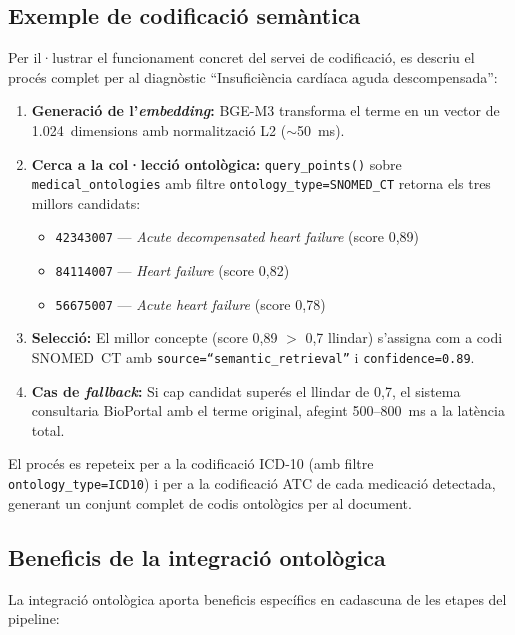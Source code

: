 \documentclass[CAT]{TFUOC}%
\begin{document}
\subsection{Exemple de codificació semàntica}

Per il·lustrar el funcionament concret del servei de codificació, es descriu el procés complet per al diagnòstic ``Insuficiència cardíaca aguda descompensada'':

\begin{enumerate}
    \item \textbf{Generació de l'\textit{embedding}:} BGE-M3 transforma el terme en un vector de 1.024~dimensions amb normalització L2 ($\sim$50~ms).

    \item \textbf{Cerca a la col·lecció ontològica:} \texttt{query\_points()} sobre \texttt{medical\_ontologies} amb filtre \texttt{ontology\_type=SNOMED\_CT} retorna els tres millors candidats:
    \begin{itemize}
        \item \texttt{42343007} --- \textit{Acute decompensated heart failure} (score 0,89)
        \item \texttt{84114007} --- \textit{Heart failure} (score 0,82)
        \item \texttt{56675007} --- \textit{Acute heart failure} (score 0,78)
    \end{itemize}

    \item \textbf{Selecció:} El millor concepte (score 0,89 $>$ 0,7 llindar) s'assigna com a codi SNOMED~CT amb \texttt{source=``semantic\_retrieval''} i \texttt{confidence=0.89}.

    \item \textbf{Cas de \textit{fallback}:} Si cap candidat superés el llindar de 0,7, el sistema consultaria BioPortal amb el terme original, afegint 500--800~ms a la latència total.
\end{enumerate}

El procés es repeteix per a la codificació ICD-10 (amb filtre \texttt{ontology\_type=ICD10}) i per a la codificació ATC de cada medicació detectada, generant un conjunt complet de codis ontològics per al document.

\subsection{Beneficis de la integració ontològica}

La integració ontològica aporta beneficis específics en cadascuna de les etapes del pipeline:
\end{document}
